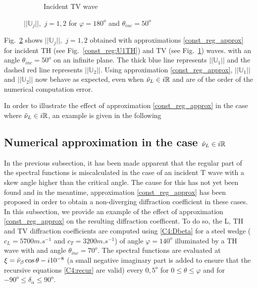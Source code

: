 \begin{figure}
\begin{subfigure}[b]{0.45\textwidth}
        \caption{Incident TV wave}
        \label{const_reg:U1TV}
    \end{subfigure} 
\caption{$||\mathbb{U}_j||, \, \, j=1,2$ for $\varphi=180^o$ and $\theta_{inc}=50^o$}
\label{const_reg:U1}
\end{figure}

Fig.~\ref{const_reg:U1} shows $||\mathbb{U}_j||, \, \, j=1,2$ obtained with approximations \eqref{const_reg_approx} for incident TH (see Fig.~\ref{const_reg:U1TH}) and TV (see Fig.~\ref{const_reg:U1TV}) waves. with an angle $\theta_{inc}=50^o$ on an infinite plane. The thick blue line represents $||\mathbb{U}_1||$ and the dashed red line represents $||\mathbb{U}_2||$. Using  approximation \eqref{const_reg_approx}, $||\mathbb{U}_1||$ and $||\mathbb{U}_2||$ now behave as expected, even when $\tilde{\nu}_L \in i\mathbb{R}$ and are  of the order of the numerical computation error.

In order to illustrate the effect of approximation \eqref{const_reg_approx} in the case where $\tilde{\nu}_L \in i\mathbb{R}$, an example is given in the following

\subsection{Numerical approximation in the case $\tilde{\nu}_L \in i\mathbb{R}$}

In the previous subsection, it has been made apparent that the regular part of the spectral functions is miscalculated in the case of an incident T wave with a skew angle higher than the critical angle. The cause for this has not yet been found and in the meantime, approximation \eqref{const_reg_approx} has been proposed in order to obtain a non-diverging diffraction coefficient in these cases. In this subsection, we provide an example of the effect of approximation \eqref{const_reg_approx} on the resulting diffraction coefficent. To do so, the L, TH and TV diffraction coefficients are computed using \eqref{C4:Dbeta} for a steel wedge ($c_L=5700m.s^{-1}$ and $c_T=3200m.s^{-1}$) of angle $\varphi=140^o$ illuminated by a TH wave with and angle $\theta_{inc}=70^o$. The spectral functions are evaluated at $\xi=\tilde{\nu}_{\beta}\cos\theta -i10^{-8}$ (a small negative imaginary part is added to ensure that the recursive equations \eqref{C4:recur} are valid) every $0,5^o$ for $0\leq\theta\leq \varphi$ and for $-90^o\leq \delta_{\alpha} \leq 90^o$.

